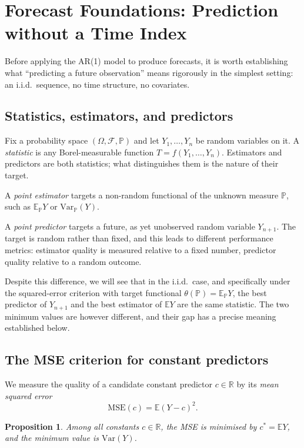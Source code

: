 \documentclass[a4paper,oneside,12pt]{extarticle}
\theoremstyle{plain}
\newtheorem{proposition}{Proposition}
\theoremstyle{definition}
\theoremstyle{remark}
\newcommand*{\E}{\mathbb{E}}
\newcommand*{\mbR}{\mathbb{R}}
\newcommand*{\mP}{\mathbb{P}}
\newcommand*{\mF}{\mathcal{F}}
\begin{document}
\section{Forecast Foundations: Prediction without a Time Index}
\label{sec:forecast}

Before applying the AR(1) model to produce forecasts, it is worth
establishing what ``predicting a future observation'' means rigorously in
the simplest setting: an i.i.d.\ sequence, no time structure, no
covariates.

\subsection{Statistics, estimators, and predictors}

Fix a probability space $(\Omega,\mF,\mP)$ and let $Y_1,\ldots,Y_n$ be
random variables on it. A \emph{statistic} is any Borel-measurable
function $T = f(Y_1,\ldots,Y_n)$. Estimators and predictors are both
statistics; what distinguishes them is the nature of their target.

A \emph{point estimator} targets a non-random functional of the unknown
measure $\mP$, such as $\E_\mP Y$ or $\mathrm{Var}_\mP(Y)$.

A \emph{point predictor} targets a future, as yet unobserved random
variable $Y_{n+1}$. The target is random rather than fixed, and this
leads to different performance metrics: estimator quality is measured
relative to a fixed number, predictor quality relative to a random outcome.

Despite this difference, we will see that in the i.i.d.\ case, and
specifically under the squared-error criterion with target functional
$\theta(\mP) = \E_\mP Y$, the best predictor of $Y_{n+1}$ and the best
estimator of $\E Y$ are the same statistic. The two minimum values are
however different, and their gap has a precise meaning established below.

\subsection{The MSE criterion for constant predictors}

We measure the quality of a candidate constant predictor $c \in \mbR$ by
its \emph{mean squared error}
\[
\mathrm{MSE}(c) = \E(Y - c)^2.
\]

\begin{proposition}
\label{prop:best_constant}
Among all constants $c \in \mbR$, the MSE is minimised by $c^* = \E Y$,
and the minimum value is $\mathrm{Var}(Y)$.
\end{proposition}
\end{document}
